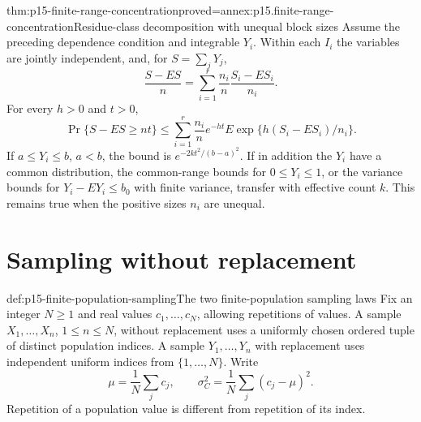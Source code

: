 \begin{hbtheorem}{thm:p15-finite-range-concentration}{proved=annex:p15.finite-range-concentration}{Residue-class decomposition with unequal block sizes}
Assume the preceding dependence condition and integrable \(Y_i\).
Within each \(I_i\) the variables are jointly independent, and, for
\(S=\sum_jY_j\),
\[
 \frac{S-ES}{n}
 =\sum_{i=1}^r\frac{n_i}{n}\frac{S_i-ES_i}{n_i}.
\]
For every \(h>0\) and \(t>0\),
\[
 \Pr\{S-ES\geq nt\}
 \leq\sum_{i=1}^r\frac{n_i}{n}e^{-ht}
       E\exp\{h(S_i-ES_i)/n_i\}.
\]
If \(a\leq Y_i\leq b\), \(a<b\), the bound is
\(e^{-2kt^2/(b-a)^2}\). If in addition the \(Y_i\) have a common
distribution, the common-range bounds for \(0\leq Y_i\leq1\), or
the variance bounds for \(Y_i-EY_i\leq b_0\) with finite variance,
transfer with effective count \(k\).
This remains true when the positive sizes \(n_i\) are unequal.
\end{hbtheorem}

\section{Sampling without replacement}
\label{sec:p15-finite-population-concentration}

\begin{hbdefinition}{def:p15-finite-population-sampling}{The two finite-population sampling laws}
Fix an integer \(N\geq1\) and real values \(c_1,\ldots,c_N\), allowing
repetitions of values.
A sample \(X_1,\ldots,X_n\), \(1\leq n\leq N\), without replacement
uses a uniformly chosen ordered tuple of distinct population indices.
A sample \(Y_1,\ldots,Y_n\) with replacement uses independent uniform
indices from \(\{1,\ldots,N\}\). Write
\[
 \mu=\frac1N\sum_jc_j,\qquad
 \sigma_C^2=\frac1N\sum_j(c_j-\mu)^2.
\]
Repetition of a population value is different from repetition of its index.
\end{hbdefinition}

